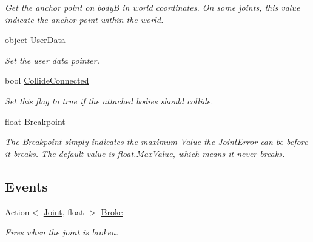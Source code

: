 \begin{DoxyCompactItemize}
\begin{DoxyCompactList}\small\item\em Get the anchor point on body\+B in world coordinates. On some joints, this value indicate the anchor point within the world. \end{DoxyCompactList}\item 
object \hyperlink{class_farseer_physics_1_1_dynamics_1_1_joints_1_1_joint_a826db0676007538867698ed61ec24c65}{User\+Data}
\begin{DoxyCompactList}\small\item\em Set the user data pointer. \end{DoxyCompactList}\item 
bool \hyperlink{class_farseer_physics_1_1_dynamics_1_1_joints_1_1_joint_a970d4f1d6bcf16af3c82ea97ebc1a966}{Collide\+Connected}
\begin{DoxyCompactList}\small\item\em Set this flag to true if the attached bodies should collide. \end{DoxyCompactList}\item 
float \hyperlink{class_farseer_physics_1_1_dynamics_1_1_joints_1_1_joint_a78584756db5015f83e5c5f54e132f634}{Breakpoint}
\begin{DoxyCompactList}\small\item\em The Breakpoint simply indicates the maximum Value the Joint\+Error can be before it breaks. The default value is float.\+Max\+Value, which means it never breaks. \end{DoxyCompactList}\end{DoxyCompactItemize}
\subsection*{Events}
\begin{DoxyCompactItemize}
\item 
Action$<$ \hyperlink{class_farseer_physics_1_1_dynamics_1_1_joints_1_1_joint}{Joint}, float $>$ \hyperlink{class_farseer_physics_1_1_dynamics_1_1_joints_1_1_joint_aaf2b3615a95b0e3d40083b1fd886af74}{Broke}
\begin{DoxyCompactList}\small\item\em Fires when the joint is broken. \end{DoxyCompactList}\end{DoxyCompactItemize}



